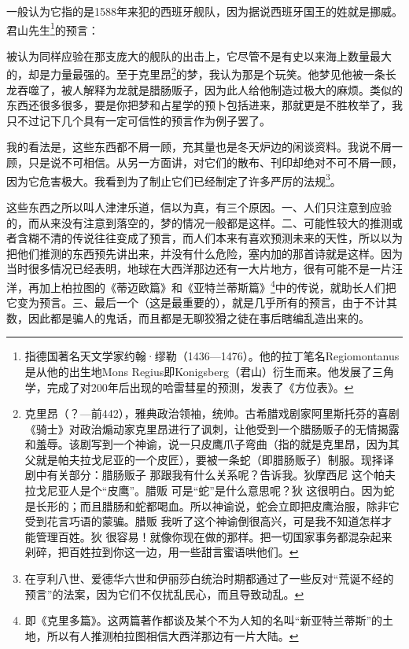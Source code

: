 \par 一般认为它指的是1588年来犯的西班牙舰队，因为据说西班牙国王的姓就是挪威。君山先生\footnote{指德国著名天文学家约翰·缪勒（1436—1476）。他的拉丁笔名Regiomontanus是从他的出生地Mons Regius即Konigsberg（君山）衍生而来。他发展了三角学，完成了对200年后出现的哈雷彗星的预测，发表了《方位表》。}的预言：
\par 被认为同样应验在那支庞大的舰队的出击上，它尽管不是有史以来海上数量最大的，却是力量最强的。至于克里昂\footnote{克里昂（？—前442），雅典政治领袖，统帅。古希腊戏剧家阿里斯托芬的喜剧《骑士》对政治煽动家克里昂进行了讽刺，让他受到一个腊肠贩子的无情揭露和羞辱。该剧写到一个神谕，说一只皮鹰爪子弯曲（指的就是克里昂，因为其父就是帕夫拉戈尼亚的一个皮匠），要被一条蛇（即腊肠贩子）制服。现择译剧中有关部分：腊肠贩子 那跟我有什么关系呢？告诉我。狄摩西尼 这个帕夫拉戈尼亚人是个“皮鹰”。腊贩 可是“蛇”是什么意思呢？狄 这很明白。因为蛇是长形的；而且腊肠和蛇都喝血。所以神谕说，蛇会立即把皮鹰治服，除非它受到花言巧语的蒙骗。腊贩 我听了这个神谕倒很高兴，可是我不知道怎样才能管理百姓。狄 很容易！就像你现在做的那样。把一切国家事务都混杂起来剁碎，把百姓拉到你这一边，用一些甜言蜜语哄他们。}的梦，我认为那是个玩笑。他梦见他被一条长龙吞噬了，被人解释为龙就是腊肠贩子，因为此人给他制造过极大的麻烦。类似的东西还很多很多，要是你把梦和占星学的预卜包括进来，那就更是不胜枚举了，我只不过记下几个具有一定可信性的预言作为例子罢了。
\par 我的看法是，这些东西都不屑一顾，充其量也是冬天炉边的闲谈资料。我说不屑一顾，只是说不可相信。从另一方面讲，对它们的散布、刊印却绝对不可不屑一顾，因为它危害极大。我看到为了制止它们已经制定了许多严厉的法规\footnote{在亨利八世、爱德华六世和伊丽莎白统治时期都通过了一些反对“荒诞不经的预言”的法案，因为它们不仅扰乱民心，而且导致动乱。}。
\par 这些东西之所以叫人津津乐道，信以为真，有三个原因。一、人们只注意到应验的，而从来没有注意到落空的，梦的情况一般都是这样。二、可能性较大的推测或者含糊不清的传说往往变成了预言，而人们本来有喜欢预测未来的天性，所以以为把他们推测的东西预先讲出来，并没有什么危险，塞内加的那首诗就是这样。因为当时很多情况已经表明，地球在大西洋那边还有一大片地方，很有可能不是一片汪洋，再加上柏拉图的《蒂迈欧篇》和《亚特兰蒂斯篇》\footnote{即《克里多篇》。这两篇著作都谈及某个不为人知的名叫“新亚特兰蒂斯”的土地，所以有人推测柏拉图相信大西洋那边有一片大陆。}中的传说，就助长人们把它变为预言。三、最后一个（这是最重要的），就是几乎所有的预言，由于不计其数，因此都是骗人的鬼话，而且都是无聊狡猾之徒在事后瞎编乱造出来的。




